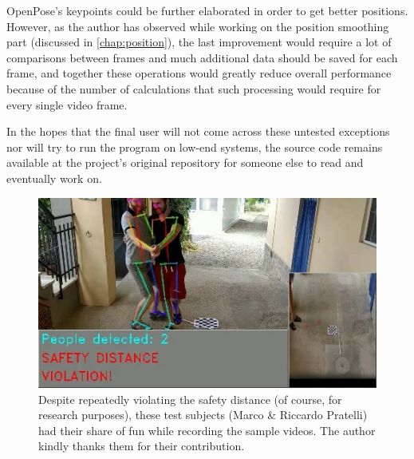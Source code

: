 \documentclass[12pt]{article}
\begin{document}
OpenPose's keypoints could be further elaborated in order to get better positions. However, as the author has observed while working on the position smoothing part (discussed in \ref{chap:position}), the last improvement would require a lot of comparisons between frames and much additional data should be saved for each frame, and together these operations would greatly reduce overall performance because of the number of calculations that such processing would require for every single video frame.

In the hopes that the final user will not come across these untested exceptions nor will try to run the program on low-end systems, the source code remains available at the project's original repository\cite{repo} for someone else to read and eventually work on.






\vspace{3cm}

\begin{figure}[H]
\begin{center}
    \includegraphics[width=0.85\linewidth]{img/sample_c3.jpg}
\end{center}
   \caption{Despite repeatedly violating the safety distance (of course, for research purposes), these test subjects (Marco \& Riccardo Pratelli) had their share of fun while recording the sample videos. The author kindly thanks them for their contribution.}
\label{fig:c3}
\end{figure}

\end{document}

